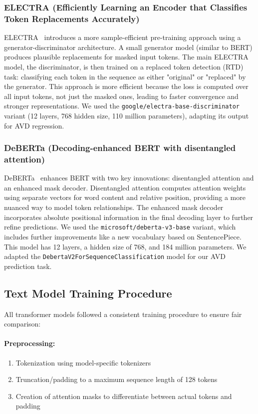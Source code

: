 \documentclass[12pt]{article}
\begin{document}
\subsubsection{ELECTRA (Efficiently Learning an Encoder that Classifies Token Replacements Accurately)}
ELECTRA~\cite{clark2020electra} introduces a more sample-efficient pre-training approach using a generator-discriminator architecture. A small generator model (similar to BERT) produces plausible replacements for masked input tokens. The main ELECTRA model, the discriminator, is then trained on a replaced token detection (RTD) task: classifying each token in the sequence as either "original" or "replaced" by the generator. This approach is more efficient because the loss is computed over all input tokens, not just the masked ones, leading to faster convergence and stronger representations. We used the \texttt{google/electra-base-discriminator} variant (12 layers, 768 hidden size, 110 million parameters), adapting its output for AVD regression.

\subsubsection{DeBERTa (Decoding-enhanced BERT with disentangled attention)}
DeBERTa~\cite{he2020deberta} enhances BERT with two key innovations: disentangled attention and an enhanced mask decoder. Disentangled attention computes attention weights using separate vectors for word content and relative position, providing a more nuanced way to model token relationships. The enhanced mask decoder incorporates absolute positional information in the final decoding layer to further refine predictions. We used the \texttt{microsoft/deberta-v3-base} variant, which includes further improvements like a new vocabulary based on SentencePiece. This model has 12 layers, a hidden size of 768, and 184 million parameters. We adapted the \texttt{DebertaV2ForSequenceClassification} model for our AVD prediction task.

\subsection{Text Model Training Procedure}
All transformer models followed a consistent training procedure to ensure fair comparison:

\paragraph{Preprocessing:}
\begin{enumerate}
    \item Tokenization using model-specific tokenizers
    \item Truncation/padding to a maximum sequence length of 128 tokens
    \item Creation of attention masks to differentiate between actual tokens and padding
\end{enumerate}
\end{document}

